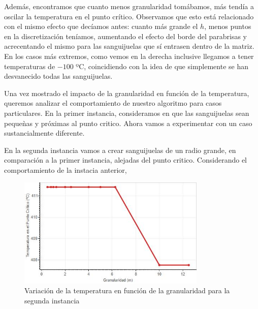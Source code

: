 Además, encontramos que cuanto menos granularidad tomábamos, más tendía a oscilar la temperatura en el punto crítico. Observamos que esto está relacionado con el mismo efecto que decíamos antes: cuanto más grande el $h$, menos puntos en la discretización teníamos, aumentando el efecto del borde del parabrisas y acrecentando el mismo para las sanguijuelas que sí entrasen dentro de la matriz. En los casos más extremos, como vemos en la derecha inclusive llegamos a tener temperaturas de $-100$ ºC, coincidiendo con la idea de que simplemente se han desvanecido todas las sanguijuelas.

Una vez mostrado el impacto de la granularidad en función de la temperatura, queremos analizar el comportamiento de nuestro algoritmo para casos particulares. En la primer instancia, consideramos en que las sanguijuelas sean peque\`nas y próximas al punto critico. Ahora vamos a experimentar con un caso sustancialmente diferente. 

En la segunda instancia vamos a crear sanguijuelas de un radio grande, en comparación a la primer instancia, alejadas del punto critico. Considerando el comportamiento de la instacia anterior,

\begin{figure}[h]
    \includegraphics[width=0.8\textwidth]{experimento 1-2}
    \caption{Variación de la temperatura en función de la granularidad para la segunda instancia}
    \label{fig:exp12}
\end{figure}